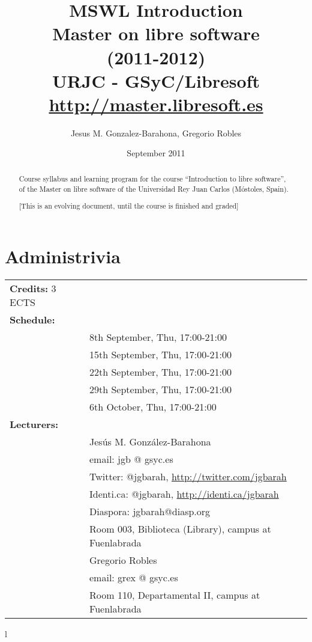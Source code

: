 \documentclass[a4paper]{article}
\title{MSWL Introduction \\
Master on libre software \\
(2011-2012) \\
URJC - GSyC/Libresoft \\
\url{http://master.libresoft.es}}
\author{Jesus M. Gonzalez-Barahona, Gregorio Robles}
\date{September 2011}
\begin{document}
\maketitle

\begin{abstract}
Course syllabus and learning program for the course ``Introduction to libre software'', of the Master on libre software of the Universidad Rey Juan Carlos (Móstoles, Spain).

[This is an evolving document, until the course is finished and graded]
\end{abstract}

\tableofcontents

\section{Administrivia}

\begin{tabular}{ll}
\textbf{Credits:} 3 ECTS \\
\textbf{Schedule:} \\
& 8th September, Thu, 17:00-21:00 \\
& 15th September, Thu, 17:00-21:00 \\
& 22th September, Thu, 17:00-21:00 \\
& 29th September, Thu, 17:00-21:00 \\
& 6th October, Thu, 17:00-21:00 \\
\textbf{Lecturers:} \\
& Jesús M. González-Barahona \\
& \hspace{1cm} email: jgb @ gsyc.es \\
& \hspace{1cm} Twitter: @jgbarah, \url{http://twitter.com/jgbarah} \\
& \hspace{1cm} Identi.ca: @jgbarah, \url{http://identi.ca/jgbarah} \\
& \hspace{1cm} Diaspora: jgbarah@diasp.org \\
& \hspace{1cm} Room 003, Biblioteca (Library), campus at Fuenlabrada \\
& Gregorio Robles \\
& \hspace{1cm} email: grex @ gsyc.es \\
& \hspace{1cm} Room 110, Departamental II, campus at Fuenlabrada \\
\end{tabular}{l}
\end{document}
